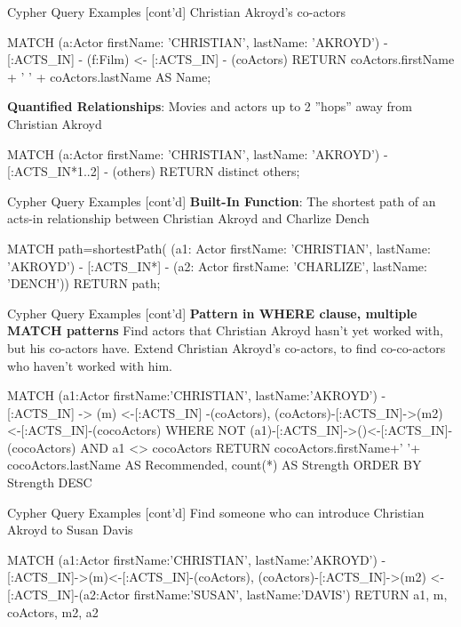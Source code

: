 \documentclass[ignorenonframetext,xcolor=x11names]{beamer}
\begin{document}
\begin{frame}[fragile]{Cypher Query Examples \small [cont'd]}
Christian Akroyd's co-actors
\footnotesize
\begin{cyphercode}
MATCH (a:Actor {firstName: 'CHRISTIAN', 
                lastName: 'AKROYD'}) 
      - [:ACTS_IN] 
      - (f:Film) 
     <- [:ACTS_IN] 
      - (coActors) 
RETURN coActors.firstName + ' ' + 
       coActors.lastName AS Name;
\end{cyphercode}
\normalsize
\textbf{Quantified Relationships}: Movies and actors up to 2 ''hops'' away from Christian Akroyd
\footnotesize
\begin{cyphercode}
MATCH (a:Actor {firstName: 'CHRISTIAN', 
                lastName: 'AKROYD'})
      - [:ACTS_IN*1..2] 
      - (others) 
RETURN distinct others;
\end{cyphercode}
\end{frame}

\begin{frame}[fragile]{Cypher Query Examples \small [cont'd]}
\textbf{Built-In Function}: The shortest path of an acts-in relationship between Christian Akroyd and Charlize Dench
\footnotesize
\begin{cyphercode}
MATCH path=shortestPath( 
  (a1: Actor {firstName: 'CHRISTIAN', 
              lastName: 'AKROYD'}) 
  - [:ACTS_IN*] 
  - (a2: Actor {firstName: 'CHARLIZE', 
                lastName: 'DENCH'})) 
RETURN path;
\end{cyphercode}
\end{frame}

\begin{frame}[fragile]{Cypher Query Examples \small [cont'd]}
\textbf{Pattern in WHERE clause, multiple MATCH patterns} Find actors that Christian Akroyd hasn't yet worked with, but his co-actors have. Extend Christian Akroyd's co-actors, to find co-co-actors who haven't worked with him.
\footnotesize
\begin{cyphercode}
MATCH (a1:Actor {firstName:'CHRISTIAN', 
                 lastName:'AKROYD'})
      - [:ACTS_IN] -> (m) <-[:ACTS_IN] -(coActors),
  (coActors)-[:ACTS_IN]->(m2)<-[:ACTS_IN]-(cocoActors)
WHERE NOT (a1)-[:ACTS_IN]->()<-[:ACTS_IN]-(cocoActors) 
      AND a1 <> cocoActors
RETURN cocoActors.firstName+' '+
       cocoActors.lastName AS Recommended, 
       count(*) AS Strength 
ORDER BY Strength DESC
\end{cyphercode}
\end{frame}

\begin{frame}[fragile]{Cypher Query Examples \small [cont'd]}
Find someone who can introduce Christian Akroyd to Susan Davis
\footnotesize
\begin{cyphercode}
MATCH (a1:Actor {firstName:'CHRISTIAN', 
                 lastName:'AKROYD'})
          -[:ACTS_IN]->(m)<-[:ACTS_IN]-(coActors),
      (coActors)-[:ACTS_IN]->(m2)
      <-[:ACTS_IN]-(a2:Actor {firstName:'SUSAN', 
                              lastName:'DAVIS'})
RETURN a1, m, coActors, m2, a2
\end{cyphercode}
\end{frame}
\end{document}
